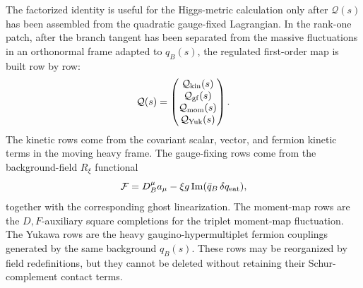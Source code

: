 \begin{example}
\label{ex:higgs-branch-off-shell-row-completion}
The factorized identity is useful for the Higgs-metric calculation only after
\({\mathcal Q}(s)\) has been assembled from the quadratic gauge-fixed
Lagrangian.  In the rank-one patch, after the branch tangent has been separated
from the massive fluctuations in an orthonormal frame adapted to \(q_B(s)\), the
regulated first-order map is built row by row:
\begin{equation}
  {\mathcal Q}(s)
  =
  \begin{pmatrix}
    {\mathcal Q}_{\rm kin}(s)\\
    {\mathcal Q}_{\rm gf}(s)\\
    {\mathcal Q}_{\rm mom}(s)\\
    {\mathcal Q}_{\rm Yuk}(s)
  \end{pmatrix}.
  \label{eq:higgs-branch-row-completed-heavy-map}
\end{equation}
The kinetic rows come from the covariant scalar, vector, and fermion kinetic
terms in the moving heavy frame.  The gauge-fixing rows come from the
background-field \(R_\xi\) functional
\[
  {\mathcal F}
  =
  D_B^\mu a_\mu
  -
  \xi g\,{\rm Im}(\bar q_B\,\delta q_{\rm eat}),
\]
together with the corresponding ghost linearization.  The moment-map rows are
the \(D,F\)-auxiliary square completions for the triplet moment-map fluctuation.
The Yukawa rows are the heavy gaugino-hypermultiplet fermion couplings generated
by the same background \(q_B(s)\).  These rows may be reorganized by field
redefinitions, but they cannot be deleted without retaining their Schur-complement
contact terms.


\end{example}
